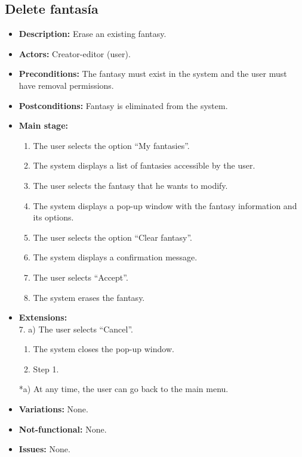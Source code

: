 \subsection{Delete fantasía}
\begin{itemize}
	\item \textbf{Description:} Erase an existing fantasy.
	\item \textbf{Actors:} Creator-editor (user).
	\item \textbf{Preconditions:} The fantasy must exist in the system and the user must have removal permissions.
	\item \textbf{Postconditions:} Fantasy is eliminated from the system.
	\item \textbf{Main stage:}
	\begin{enumerate}
		\item The user selects the option ``My fantasies''.
		\item The system displays a list of fantasies accessible by the user.
		\item The user selects the fantasy that he wants to modify.
		\item The system displays a pop-up window with the fantasy information and its options.
		\item The user selects the option ``Clear fantasy''.
		\item The system displays a confirmation message.
		\item The user selects ``Accept''.
		\item The system erases the fantasy.
	\end{enumerate}
	\item \textbf{Extensions:}  \\7. a) The user selects ``Cancel''.
	\begin{enumerate}
		\item The system closes the pop-up window.
		\item Step 1.
	\end{enumerate}
	*a) At any time, the user can go back to the main menu.
	\item \textbf{Variations:} None.
	\item \textbf{Not-functional:} None.
	\item \textbf{Issues:} None.
\end{itemize}


